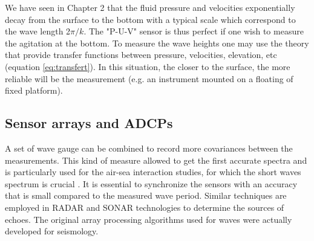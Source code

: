 We have seen in Chapter 2 that the fluid pressure and velocities exponentially decay from the surface to the bottom with a typical scale which correspond 
to the wave length 2$\pi/k$. The "P-U-V" sensor is thus perfect if one wish to measure the agitation at the bottom. To measure the wave heights one may use
the theory that provide transfer functions between pressure, velocities, elevation, etc (equation \ref{eq:transfert}). In this situation, the closer to 
the surface, the more reliable will be the measurement (e.g. an instrument mounted on a floating of fixed platform).

 \subsection{Sensor arrays and ADCPs}
A set of wave gauge can be combined to record more covariances between the measurements. This kind of 
measure allowed to get the first accurate spectra \citep{Donelan&al.1985} and is particularly used for the air-sea interaction studies, 
for which the short waves spectrum is crucial \citep{Graber&al.2000, Pettersson&al.2003}. It is essential to synchronize the sensors with 
an accuracy that is small compared to the measured wave period. Similar techniques are employed in RADAR and SONAR technologies to determine the sources of echoes. The original array processing algorithms 
used for waves were actually developed for seismology.


